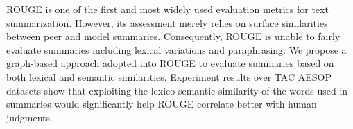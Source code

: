 ROUGE is one of the first and most widely used evaluation metrics for text summarization. However, its assessment merely relies on surface similarities between peer and model summaries. Consequently, ROUGE is unable to fairly evaluate summaries including lexical variations and paraphrasing. We propose a graph-based approach adopted into ROUGE to evaluate summaries based on both lexical and semantic similarities. Experiment results over TAC AESOP datasets show that exploiting the lexico-semantic similarity of the words used in summaries would significantly help ROUGE correlate better with human judgments.

